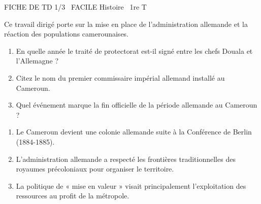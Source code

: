 \documentclass[11pt]{article}
\begin{document}
\begin{tcolorbox}[enhanced,colback=popink,colframe=popink,arc=10pt,boxrule=0pt,left=12pt,right=12pt,top=9pt,bottom=9pt]
{\color{white}\popxbold\small FICHE DE TD 1/3 \textbullet\ FACILE \hfill Histoire \textbullet\ 1re T\par}
\end{tcolorbox}
\vspace{4pt}
Ce travail dirigé porte sur la mise en place de l'administration allemande et la réaction des populations camerounaises.

\begin{exercice}
\begin{enumerate}
    \item En quelle année le traité de protectorat est-il signé entre les chefs Douala et l'Allemagne ?
    \item Citez le nom du premier commissaire impérial allemand installé au Cameroun.
    \item Quel événement marque la fin officielle de la période allemande au Cameroun ?
\end{enumerate}
\end{exercice}

\begin{exercice}
\begin{enumerate}
    \item Le Cameroun devient une colonie allemande suite à la Conférence de Berlin (1884-1885).
    \item L'administration allemande a respecté les frontières traditionnelles des royaumes précoloniaux pour organiser le territoire.
    \item La politique de « mise en valeur » visait principalement l'exploitation des ressources au profit de la métropole.
\end{enumerate}
\end{exercice}
\end{document}
